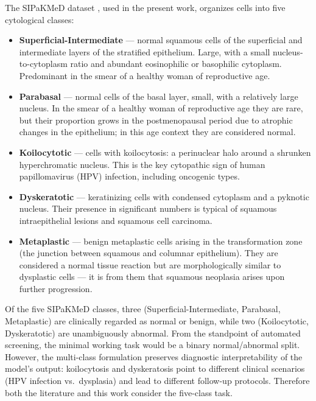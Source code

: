 \documentclass[14pt,a4paper]{extreport}
\begin{document}
The SIPaKMeD dataset \cite{plissiti2018sipakmed}, used in the present
work, organizes cells into five cytological classes:
\begin{itemize}
    \item \textbf{Superficial-Intermediate} --- normal squamous cells of
          the superficial and intermediate layers of the stratified
          epithelium. Large, with a small nucleus-to-cytoplasm ratio and
          abundant eosinophilic or basophilic cytoplasm. Predominant in
          the smear of a healthy woman of reproductive age.
    \item \textbf{Parabasal} --- normal cells of the basal layer, small,
          with a relatively large nucleus. In the smear of a healthy
          woman of reproductive age they are rare, but their proportion
          grows in the postmenopausal period due to atrophic changes in
          the epithelium; in this age context they are considered
          normal.
    \item \textbf{Koilocytotic} --- cells with koilocytosis: a
          perinuclear halo around a shrunken hyperchromatic nucleus.
          This is the key cytopathic sign of human papillomavirus (HPV)
          infection, including oncogenic types.
    \item \textbf{Dyskeratotic} --- keratinizing cells with condensed
          cytoplasm and a pyknotic nucleus. Their presence in
          significant numbers is typical of squamous intraepithelial
          lesions and squamous cell carcinoma.
    \item \textbf{Metaplastic} --- benign metaplastic cells arising in
          the transformation zone (the junction between squamous and
          columnar epithelium). They are considered a normal tissue
          reaction but are morphologically similar to dysplastic cells
          --- it is from them that squamous neoplasia arises upon
          further progression.
\end{itemize}

Of the five SIPaKMeD classes, three (Superficial-Intermediate,
Parabasal, Metaplastic) are clinically regarded as normal or benign,
while two (Koilocytotic, Dyskeratotic) are unambiguously abnormal. From
the standpoint of automated screening, the minimal working task would be
a binary normal/abnormal split. However, the multi-class formulation
preserves diagnostic interpretability of the model's output:
koilocytosis and dyskeratosis point to different clinical scenarios (HPV
infection vs.\ dysplasia) and lead to different follow-up protocols.
Therefore both the literature and this work consider the five-class
task.
\end{document}
